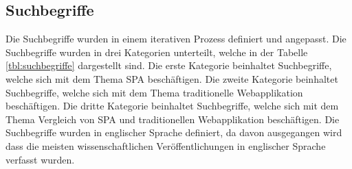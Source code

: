 \subsection{Suchbegriffe}
Die Suchbegriffe wurden in einem iterativen Prozess definiert und angepasst.
Die Suchbegriffe wurden in drei Kategorien unterteilt, welche in der Tabelle \ref*{tbl:suchbegriffe} dargestellt sind.
Die erste Kategorie beinhaltet Suchbegriffe, welche sich mit dem Thema \ac{SPA} beschäftigen.
Die zweite Kategorie beinhaltet Suchbegriffe, welche sich mit dem Thema traditionelle Webapplikation beschäftigen.
Die dritte Kategorie beinhaltet Suchbegriffe, welche sich mit dem Thema Vergleich von \ac{SPA} und traditionellen Webapplikation beschäftigen.
Die Suchbegriffe wurden in englischer Sprache definiert, da davon ausgegangen wird dass die meisten wissenschaftlichen Veröffentlichungen in englischer Sprache verfasst wurden.

